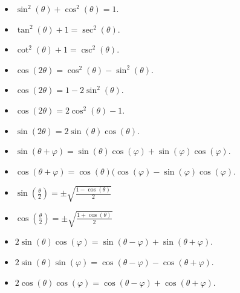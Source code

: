 \documentclass[12pt]{amsart}
\begin{document}
\begin{itemize}
\item
  $\sin^2(\theta) + \cos^2(\theta) = 1$.
\item
  $\tan^2(\theta) + 1 = \sec^2(\theta)$.
\item
  $\cot^2(\theta) + 1 = \csc^2(\theta)$.
\item
  $\cos(2\theta) = \cos^2(\theta) - \sin^2(\theta)$.
\item
  $\cos(2\theta) = 1 - 2\sin^2(\theta)$.
\item
  $\cos(2\theta) = 2\cos^2(\theta) - 1$.
\item
  $\sin(2\theta) = 2\sin(\theta)\cos(\theta)$.
\item
  $\sin(\theta + \varphi) = \sin(\theta)\cos(\varphi) + \sin(\varphi)\cos(\varphi)$.
\item
  $\cos(\theta + \varphi) = \cos(\theta)(\cos(\varphi) - \sin(\varphi)\cos(\varphi)$.
\item
  $\displaystyle{\sin\left(\frac{\theta}{2}\right) = \pm \sqrt{\frac{1 - \cos(\theta)}{2}}}$
\item
  $\displaystyle{\cos\left(\frac{\theta}{2}\right) = \pm \sqrt{\frac{1 + \cos(\theta)}{2}}}$
\item
  $2\sin(\theta)\cos(\varphi) = \sin(\theta - \varphi) + \sin(\theta + \varphi)$.
\item
  $2\sin(\theta)\sin(\varphi) = \cos(\theta - \varphi) - \cos(\theta + \varphi)$.
\item
  $2\cos(\theta)\cos(\varphi) = \cos(\theta - \varphi) + \cos(\theta + \varphi)$.
\end{itemize}
\end{document}
